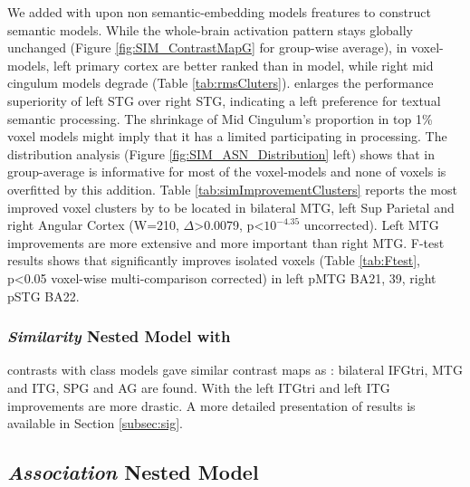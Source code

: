 

We added with upon non semantic-embedding models  freatures to construct \similarity semantic models. While the whole-brain activation pattern stays globally unchanged (Figure \ref{fig:SIM_ContrastMapG} for group-wise average), in  voxel-models, left primary cortex are better ranked than in  model, while right mid cingulum models degrade (Table \ref{tab:rmsCluters}).  enlarges the performance superiority of left STG over right STG, indicating a left preference for textual semantic \similarity processing. The shrinkage of Mid Cingulum's proportion in top 1\% voxel models might imply that it has a limited participating in \similarity processing. The  distribution analysis (Figure \ref{fig:SIM_ASN_Distribution} left) shows that in group-average  is informative for most of the voxel-models and none of voxels is overfitted by this addition. Table \ref{tab:simImprovementClusters} reports the most improved voxel clusters by  to be located in bilateral MTG, left Sup Parietal and right Angular Cortex (W=210, \(\Delta\)>0.0079, p<\(10^{-4.35}\) uncorrected). Left MTG improvements are more extensive and more important than right MTG. F-test results shows that  significantly improves isolated voxels (Table \ref{tab:Ftest}, p<0.05 voxel-wise multi-comparison corrected) in left pMTG BA21, 39, right pSTG BA22.

\subsubsection{\emph{Similarity} Nested Model with }

 contrasts with  class models gave similar contrast maps as : bilateral IFGtri, MTG and ITG, SPG and AG are found. With  the left ITGtri and left ITG improvements are more drastic. A more detailed presentation of  results is available in Section \ref{subsec:sig}.

\subsection{\emph{Association} Nested Model}

